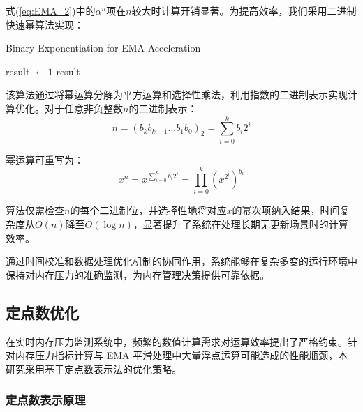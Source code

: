 式(\ref{eq:EMA_2})中的\(\alpha^n\)项在\(n\)较大时计算开销显著。为提高效率，我们采用二进制快速幂算法实现：

\begin{algorithm}[htbp]
    \caption{Binary Exponentiation for EMA Acceleration}
    \label{alg:fast_exp}
    \SetAlgoLined
    
    
    result \(\gets 1\)\;
    \Return result\;
\end{algorithm}

该算法通过将幂运算分解为平方运算和选择性乘法，利用指数的二进制表示实现计算优化。对于任意非负整数\(n\)的二进制表示：
\begin{equation}
n = (b_k b_{k-1} \ldots b_1 b_0)_2 = \sum_{i=0}^{k} b_i 2^i
\end{equation}

幂运算可重写为：
\begin{equation}
x^n = x^{\sum_{i=0}^{k} b_i 2^i} = \prod_{i=0}^k (x^{2^i})^{b_i}
\end{equation}

算法仅需检查\(n\)的每个二进制位，并选择性地将对应\(x\)的幂次项纳入结果，时间复杂度从\(O(n)\)降至\(O(\log n)\)，显著提升了系统在处理长期无更新场景时的计算效率。

通过时间校准和数据处理优化机制的协同作用，系统能够在复杂多变的运行环境中保持对内存压力的准确监测，为内存管理决策提供可靠依据。


\subsection{定点数优化}
\label{sec:fixed_point_optimization}

在实时内存压力监测系统中，频繁的数值计算需求对运算效率提出了严格约束。针对内存压力指标计算与 EMA 平滑处理中大量浮点运算可能造成的性能瓶颈，本研究采用基于定点数表示法的优化策略。

\subsubsection{定点数表示原理}


